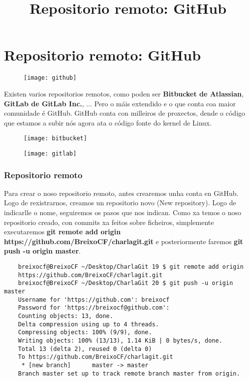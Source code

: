 \section{Repositorio remoto: GitHub}

\title[Git e GitHub]{Repositorio remoto: GitHub}
\author[Fran Rúa e Breixo Camiña]{}

\begin{frame}
  \titlepage
  \begin{figure}[H]
    \centering
    \label{fig:github}
    \texttt{[image: github]}
  \end{figure}
\end{frame}

\begin{frame}[fragile]
  Existen varios repositorios remotos, como poden ser \textbf{Bitbucket de Atlassian},
  \textbf{GitLab de GitLab Inc.}, ... Pero o máis extendido e o que conta coa maior
  comunidade é GitHub. GitHub conta con milleiros de proxectos, dende o código
  que estamos a subir nós agora ata o código fonte do kernel de Linux.
  \begin{multicols}{2}
    \begin{figure}
      \texttt{[image: bitbucket]}
    \end{figure}
    \columnbreak
    \begin{figure}
      \texttt{[image: gitlab]}
    \end{figure}
  \end{multicols}
\end{frame}

\begin{frame}[fragile]
  \frametitle{Repositorio remoto}
  \scriptsize
  Para crear o noso repositorio remoto, antes crearemos unha conta en GitHub. Logo de rexistrarnos, creamos un repositorio novo (New repository). Logo de indicarlle o nome, seguiremos os pasos que nos indican. Como xa temos o noso repositorio creado, con commits xa feitos sobre ficheiros, simplemente executaremos \textbf{git remote add origin https://github.com/BreixoCF/charlagit.git} e posteriormente faremos \textbf{git push -u origin master}.
  \tiny
\begin{verbatim}
	breixocf@BreixoCF ~/Desktop/CharlaGit 19 $ git remote add origin 
	https://github.com/BreixoCF/charlagit.git
	breixocf@BreixoCF ~/Desktop/CharlaGit 20 $ git push -u origin master 
	Username for 'https://github.com': breixocf
	Password for 'https://breixocf@github.com': 
	Counting objects: 13, done.
	Delta compression using up to 4 threads.
	Compressing objects: 100% (9/9), done.
	Writing objects: 100% (13/13), 1.14 KiB | 0 bytes/s, done.
	Total 13 (delta 2), reused 0 (delta 0)
	To https://github.com/BreixoCF/charlagit.git
	 * [new branch]      master -> master
	Branch master set up to track remote branch master from origin.
\end{verbatim}	
\end{frame}

